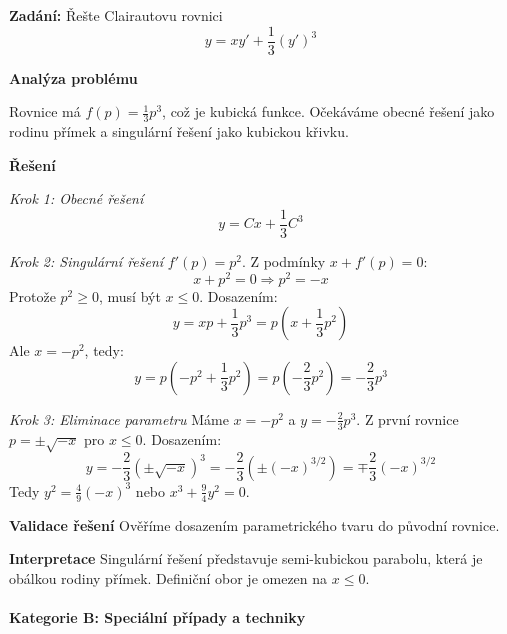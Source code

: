 \begin{example}
\label{ex:polynom-clairaut}

\noindent\textbf{Zadání:} Řešte Clairautovu rovnici
\[
y = xy' + \frac{1}{3}(y')^3
\]

\vspace{1.5\baselineskip}

\noindent\textbf{Analýza problému}

Rovnice má $f(p) = \frac{1}{3}p^3$, což je kubická funkce. Očekáváme obecné řešení jako rodinu přímek a singulární řešení jako kubickou křivku.

\vspace{1.5\baselineskip}

\noindent\textbf{Řešení}

\noindent\textit{Krok 1: Obecné řešení}
\[
y = Cx + \frac{1}{3}C^3
\]

\vspace{1\baselineskip}

\noindent\textit{Krok 2: Singulární řešení}
$f'(p) = p^2$. Z podmínky $x + f'(p) = 0$:
\[
x + p^2 = 0 \Rightarrow p^2 = -x
\]
Protože $p^2 \geq 0$, musí být $x \leq 0$. Dosazením:
\[
y = xp + \frac{1}{3}p^3 = p(x + \frac{1}{3}p^2)
\]
Ale $x = -p^2$, tedy:
\[
y = p(-p^2 + \frac{1}{3}p^2) = p(-\frac{2}{3}p^2) = -\frac{2}{3}p^3
\]

\vspace{1\baselineskip}

\noindent\textit{Krok 3: Eliminace parametru}
Máme $x = -p^2$ a $y = -\frac{2}{3}p^3$. Z první rovnice $p = \pm\sqrt{-x}$ pro $x \leq 0$. Dosazením:
\[
y = -\frac{2}{3}(\pm\sqrt{-x})^3 = -\frac{2}{3}(\pm(-x)^{3/2}) = \mp\frac{2}{3}(-x)^{3/2}
\]
Tedy $y^2 = \frac{4}{9}(-x)^3$ nebo $x^3 + \frac{9}{4}y^2 = 0$.

\vspace{1.5\baselineskip}

\noindent\textbf{Validace řešení}
Ověříme dosazením parametrického tvaru do původní rovnice.

\vspace{1.5\baselineskip}

\noindent\textbf{Interpretace}
Singulární řešení představuje semi-kubickou parabolu, která je obálkou rodiny přímek. Definiční obor je omezen na $x \leq 0$.

\end{example}

\paragraph*{Kategorie B: Speciální případy a techniky}

